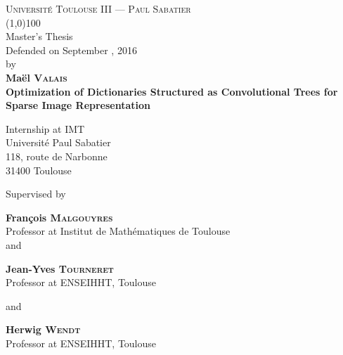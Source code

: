 \begin{titlepage}
\thispagestyle{titlepage}
\begin{center}
\textsc{Université Toulouse III — Paul Sabatier}\\
\vspace{0.5 cm}
\line(1,0){100}\\
\vspace{0.6 cm}
{{{Master's Thesis}}}\\
\vspace{0.3cm}
Defended on September , 2016\\ \vspace{0.3 cm} by\\ \vspace{0.3 cm} \textbf{Maël \textsc{Valais}}\\
\vfill
{\Huge \textbf{Optimization of Dictionaries Structured as Convolutional Trees for Sparse Image Representation }}\\
\vfill

{{Internship at \acs{IMT}}}\\
{Université Paul Sabatier}\\
{118, route de Narbonne}\\
{31400 Toulouse}\\
\vspace{2 cm}

\par Supervised by
\vspace{0.5cm}
\par \textbf{François \textsc{Malgouyres}}\\
Professor at Institut de Mathématiques de Toulouse\\ 

\vspace{0.2cm} and \vspace{0.2cm}

\textbf{Jean-Yves \textsc{Tourneret}}\\
Professor at ENSEIHHT, Toulouse

\vspace{0.2cm} and \vspace{0.2cm}

\textbf{Herwig \textsc{Wendt}}\\
Professor at ENSEIHHT, Toulouse

\vspace{1.5cm}
\end{center}
\end{titlepage}

\pagestyle{empty}
\restoregeometry

\tableofcontents


\pagestyle{body}